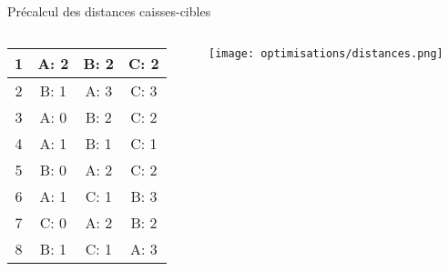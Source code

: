 \begin{frame}{Précalcul des distances caisses-cibles}
\begin{columns}[onlytextwidth]
{\begin{column}{0.49\textwidth}
\begin{tabular}{|c|c|c|c|}
                                                  1 & A: 2 & B: 2 & C: 2 \\ \hline
                                                  2 & B: 1 & A: 3 & C: 3 \\ \hline
                                                  3 & A: 0 & B: 2 & C: 2 \\ \hline
                                                  4 & A: 1 & B: 1 & C: 1 \\ \hline
                                                  5 & B: 0 & A: 2 & C: 2 \\ \hline
                                                  6 & A: 1 & C: 1 & B: 3 \\ \hline
                                                  7 & C: 0 & A: 2 & B: 2 \\ \hline
                                                  8 & B: 1 & C: 1 & A: 3 \\ \hline
                        \end{tabular}
                    \end{column}
                }
                \begin{column}{0.5\textwidth}
                    \texttt{[image: optimisations/distances.png]}
                \end{column}

            \end{columns}
        \end{frame}

        

